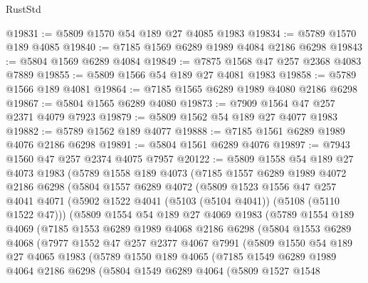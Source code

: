 \begin{lexlean}{RustStd}
\begin{coremodule}
@19831 := @5809 @1570 @54 @189 @27 @4085 @1983
@19834 := @5789 @1570 @189 @4085
@19840 := @7185 @1569 @6289 @1989 @4084 @2186 @6298
@19843 := @5804 @1569 @6289 @4084
@19849 := @7875 @1568 @47 @257 @2368 @4083 @7889
@19855 := @5809 @1566 @54 @189 @27 @4081 @1983
@19858 := @5789 @1566 @189 @4081
@19864 := @7185 @1565 @6289 @1989 @4080 @2186 @6298
@19867 := @5804 @1565 @6289 @4080
@19873 := @7909 @1564 @47 @257 @2371 @4079 @7923
@19879 := @5809 @1562 @54 @189 @27 @4077 @1983
@19882 := @5789 @1562 @189 @4077
@19888 := @7185 @1561 @6289 @1989 @4076 @2186 @6298
@19891 := @5804 @1561 @6289 @4076
@19897 := @7943 @1560 @47 @257 @2374 @4075 @7957
@20122 := @5809
    @1558
    @54
    @189
    @27
    @4073
    @1983
    (@5789
      @1558
      @189
      @4073
      (@7185
        @1557
        @6289
        @1989
        @4072
        @2186
        @6298
        (@5804
          @1557
          @6289
          @4072
          (@5809
            @1523
            @1556
            @47
            @257
            @4041
            @4071
            (@5902 @1522 @4041 (@5103 (@5104 @4041)) (@5108 (@5110 @1522 @47)))
            (@5809
              @1554
              @54
              @189
              @27
              @4069
              @1983
              (@5789
                @1554
                @189
                @4069
                (@7185
                  @1553
                  @6289
                  @1989
                  @4068
                  @2186
                  @6298
                  (@5804
                    @1553
                    @6289
                    @4068
                    (@7977
                      @1552
                      @47
                      @257
                      @2377
                      @4067
                      @7991
                      (@5809
                        @1550
                        @54
                        @189
                        @27
                        @4065
                        @1983
                        (@5789
                          @1550
                          @189
                          @4065
                          (@7185
                            @1549
                            @6289
                            @1989
                            @4064
                            @2186
                            @6298
                            (@5804
                              @1549
                              @6289
                              @4064
                              (@5809
                                @1527
                                @1548

\end{coremodule}
\end{lexlean}
